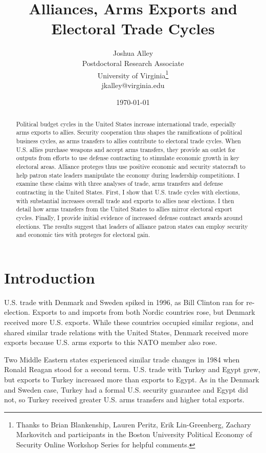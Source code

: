\documentclass[12pt]{article}
\title{\textbf{Alliances, Arms Exports and Electoral Trade Cycles}}
\author{Joshua Alley \\
Postdoctoral Research Associate \\
University of Virginia\thanks{Thanks to Brian Blankenship, Lauren Peritz, Erik Lin-Greenberg, Zachary Markovitch and participants in the Boston University Political Economy of Security Online Workshop Series for helpful comments.} \\
jkalley@virginia.edu
}
\date{\today}
\begin{document}
\maketitle 

\begin{abstract} 
Political budget cycles in the United States increase international trade, especially arms exports to allies. 
Security cooperation thus shapes the ramifications of political business cycles, as arms transfers to allies contribute to electoral trade cycles.
When U.S. allies purchase weapons and accept arms transfers, they provide an outlet for outputs from efforts to use defense contracting to stimulate economic growth in key electoral areas.
Alliance proteges thus use positive economic and security statecraft to help patron state leaders manipulate the economy during leadership competitions.  
I examine these claims with three analyses of trade, arms transfers and defense contracting in the United States. 
First, I show that U.S. trade cycles with elections, with substantial increases overall trade and exports to allies near elections.
I then detail how arms transfers from the United States to allies mirror electoral export cycles. 
Finally, I provide initial evidence of increased defense contract awards around elections.
The results suggest that leaders of alliance patron states can employ security and economic ties with proteges for electoral gain. 
\end{abstract} 


\newpage 
\doublespace 


\section{Introduction}


U.S. trade with Denmark and Sweden spiked in 1996, as Bill Clinton ran for re-election.
Exports to and imports from both Nordic countries rose, but Denmark received more U.S. exports.
While these countries occupied similar regions, and shared similar trade relations with the United States, Denmark received more exports because U.S. arms exports to this NATO member also rose.


Two Middle Eastern states experienced similar trade changes in 1984 when Ronald Reagan stood for a second term.
U.S. trade with Turkey and Egypt grew, but exports to Turkey increased more than exports to Egypt. 
As in the Denmark and Sweden case, Turkey had a formal U.S. security guarantee and Egypt did not, so Turkey received greater U.S. arms transfers and higher total exports. 
\end{document}
